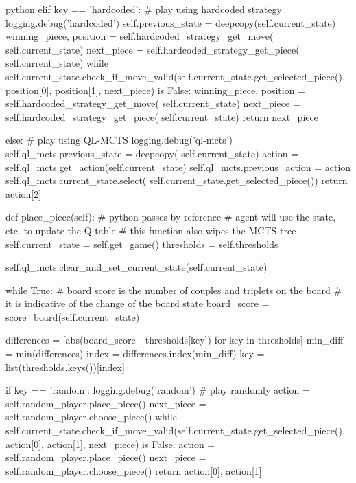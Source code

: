 \begin{mintedbox}{python}
        elif key == 'hardcoded':
            # play using hardcoded strategy
            logging.debug('hardcoded')
            self.previous_state = deepcopy(self.current_state)
            winning_piece, position = self.hardcoded_strategy_get_move(
                self.current_state)
            next_piece = self.hardcoded_strategy_get_piece(
                self.current_state)
            while self.current_state.check_if_move_valid(self.current_state.get_selected_piece(), position[0], position[1], next_piece) is False:
                winning_piece, position = self.hardcoded_strategy_get_move(
                    self.current_state)
                next_piece = self.hardcoded_strategy_get_piece(
                    self.current_state)
            return next_piece

        else:
            # play using QL-MCTS
            logging.debug('ql-mcts')
            self.ql_mcts.previous_state = deepcopy(
                self.current_state)
            action = self.ql_mcts.get_action(self.current_state)
            self.ql_mcts.previous_action = action
            self.ql_mcts.current_state.select(
                self.current_state.get_selected_piece())
            return action[2]

    def place_piece(self):
        # python passes by reference
        # agent will use the state, etc. to update the Q-table
        # this function also wipes the MCTS tree
        self.current_state = self.get_game()
        thresholds = self.thresholds

        self.ql_mcts.clear_and_set_current_state(self.current_state)

        while True:
            # board score is the number of couples and triplets on the board
            # it is indicative of the change of the board state
            board_score = score_board(self.current_state)

            differences = [abs(board_score - thresholds[key])
                            for key in thresholds]
            min_diff = min(differences)
            index = differences.index(min_diff)
            key = list(thresholds.keys())[index]

            if key == 'random':
                logging.debug('random')
                # play randomly
                action = self.random_player.place_piece()
                next_piece = self.random_player.choose_piece()
                while self.current_state.check_if_move_valid(self.current_state.get_selected_piece(), action[0], action[1], next_piece) is False:
                    action = self.random_player.place_piece()
                    next_piece = self.random_player.choose_piece()
                return action[0], action[1]


\end{mintedbox}

